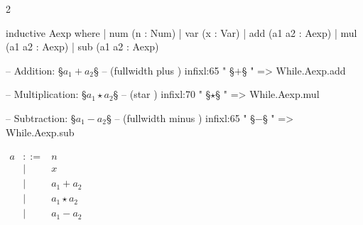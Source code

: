 \begin{paracol}{2}
\begin{leftcolumn}
    \begin{Lean_Code}
inductive Aexp where
  | num (n : Num)
  | var (x : Var)
  | add (a1 a2 : Aexp)
  | mul (a1 a2 : Aexp)
  | sub (a1 a2 : Aexp)

-- Addition: §\color{green!40!black}\(a_1 + a_2\)§
-- (fullwidth plus \plus)
infixl:65 " §\color{purple}\(+\)§ " =>
    While.Aexp.add

-- Multiplication: §\color{green!40!black}\(a_1 \star a_2\)§
-- (star \star)
infixl:70 " §\color{purple}\(\star\)§ " =>
    While.Aexp.mul

-- Subtraction: §\color{green!40!black}\(a_1 - a_2\)§
-- (fullwidth minus \minus)
infixl:65 " §\color{purple}\(-\)§ " =>
    While.Aexp.sub
    \end{Lean_Code}
\end{leftcolumn}
\begin{rightcolumn}
    \(\displaystyle
\begin{array}{lcl}
    \\[0.3em]
    a &::=& n \\ 
        &\mid& x \\ 
        &\mid& a_1 + a_2 \\ 
        &\mid& a_1 \star a_2 \\ 
        &\mid& a_1 - a_2 \\
\end{array}
    \)
\end{rightcolumn}
\end{paracol}
\vspace{1em}

